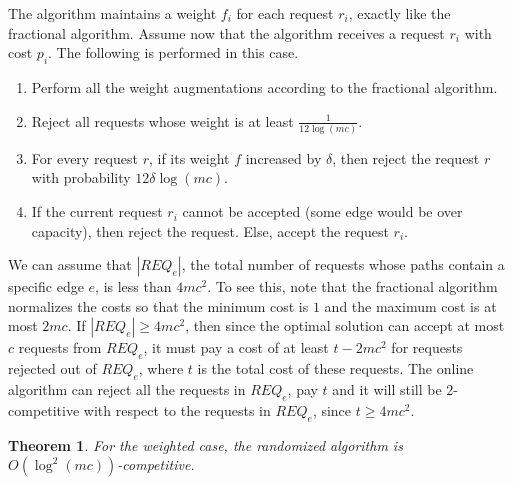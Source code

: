 \documentclass{sig-alternate}
\newtheorem{theorem}{Theorem}\newtheorem{prop}[theorem]{Proposition}
\begin{document}
The algorithm maintains a weight $f_i$ for each request $r_i$,
exactly like the fractional algorithm. Assume now that the
algorithm receives a request $r_i$ with cost $p_i$. The following
is performed in this case.
\begin{enumerate}
    \item Perform all the weight augmentations according to the fractional algorithm.
    \item Reject all requests whose weight is at least $\frac{1}{12 \log (mc)}$.\label{rand2}
    \item For every request $r$, if its weight $f$ increased by $\delta$, then reject the request $r$
    with probability $12\delta \log (mc)$.\label{rand1}
    \item If the current request $r_i$ cannot be accepted (some edge would be over capacity), then reject the
    request. Else, accept the request $r_i$.\label{rand3}
\end{enumerate}

We can assume that $|REQ_e|$, the total number of requests whose
paths contain a specific edge $e$, is less than $4mc^2$. To see
this, note that the fractional algorithm normalizes the costs so
that the minimum cost is $1$ and the maximum cost is at most
$2mc$. If $|REQ_e| \geq 4mc^2$, then since the optimal solution
can accept at most $c$ requests from $REQ_e$, it must pay a cost
of at least $t-2mc^2$ for requests rejected out of $REQ_e$, where
$t$ is the total cost of these requests. The online algorithm can
reject all the requests in $REQ_e$, pay $t$ and it will still be
$2$-competitive with respect to the requests in $REQ_e$, since $t
\geq 4mc^2$.

\begin{theorem}\label{rand_comp}
For the weighted case, the randomized algorithm is $O(\log^2
(mc))$-competitive.
\end{theorem}
\end{document}
